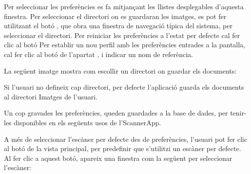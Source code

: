 \documentclass[letterpaper,11pt,catalan]{sphinxmanual}
\begin{document}

Per seleccionar les preferències es fa mitjançant les llistes desplegables d'aquesta
finestra.
Per seleccionar el directori on es guardaran les imatges, es pot fer utilitzant el botó ,
que obra una finestra de navegació típica del sistema, per seleccionar el directori.
Per reiniciar les preferències a l'estat per defecte cal fer clic al botó 
Per establir un nou perfil amb les preferències entrades a la pantalla, cal fer clic al botó  de
l'apartat , i indicar un nom de referència.

La següent imatge mostra com escollir un directori on guardar els documents:


Si l'usuari no defineix cap directori, per defecte l'aplicació guarda els documents al directori
Imatges de l'usuari.

Un cop gravades les preferències, queden guardades a la base de dades, per tenir-les
disponibles en els següents usos de l'ScannerApp.


\begin{DUlineblock}{0em}
\item[] 
\item[] 
\item[] 
\item[] 
\item[] 
\item[] 
\item[] 
\item[] 
\end{DUlineblock}

A més de seleccionar l'escàner per defecte des de preferències, l'usuari pot fer clic
al botó  de la vista principal, per predefinir que s'utilitzi un escàner
per defecte. Al fer clic a aquest botó, apareix una finestra com la següent per seleccionar
l'escàner:
\end{document}
